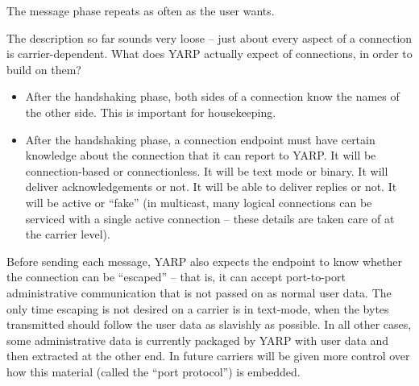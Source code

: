 The message phase repeats as often as the user wants.

The description so far sounds very loose -- just about every aspect
of a connection is carrier-dependent.  What does YARP actually
expect of connections, in order to build on them?

\begin{itemize} \pflist

\item After the handshaking phase, both sides of a connection know the
names of the other side.  This is important for housekeeping.

\item After the handshaking phase, a connection endpoint must have
certain knowledge about the connection that it can report to YARP.  It
will be connection-based or connectionless.  It will be text mode or
binary.  It will deliver acknowledgements or not.  It will be able to
deliver replies or not.  It will be active or ``fake'' (in multicast,
many logical connections can be serviced with a single active
connection -- these details are taken care of at the carrier level).

\end{itemize}

Before sending each message, YARP also expects the endpoint to know
whether the connection can be ``escaped'' -- that is, it can accept
port-to-port administrative communication that is not passed on as
normal user data.  The only time escaping is not desired on a carrier
is in text-mode, when the bytes transmitted should follow the user
data as slavishly as possible.  In all other cases, some
administrative data is currently packaged by YARP with user data and
then extracted at the other end.  In future carriers will be given
more control over how this material (called the ``port protocol'') is
embedded.


